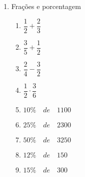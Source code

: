 \begin{enumerate}
\begin{enumerate}
			
	\end{enumerate}
	\item Frações e porcentagem
		
		\begin{enumerate}
			\item  $ \dfrac{1}{2} + \dfrac{2}{3} $
			\item  $    \dfrac{3}{5} + \dfrac{1}{2} $
			\item  $ \dfrac{2}{4} - \dfrac{3}{2} $
			\item  $  \dfrac{1}{2} \cdot  \dfrac{3}{6} $
			\item  $  10\% \quad de \quad  1100 $
			\item  $  25\% \quad de \quad 2300 $
			\item  $  50\% \quad de \quad 3250 $
			\item  $  12\% \quad de \quad 150 $
			\item  $  15\% \quad de \quad 300 $
		\end{enumerate}
\end{enumerate}


